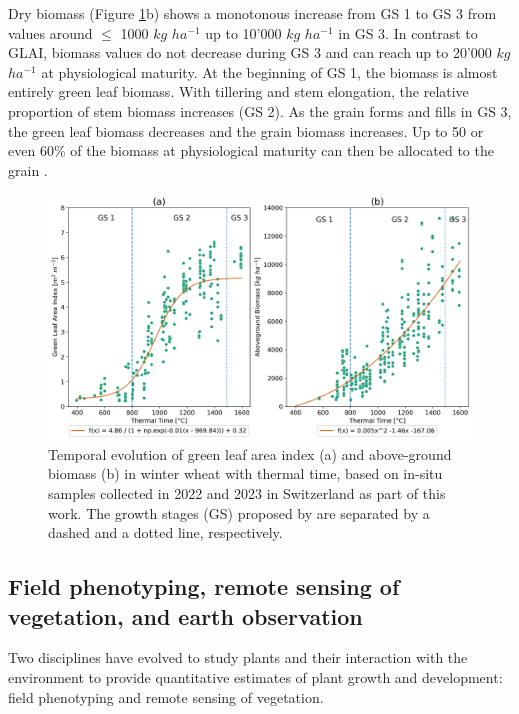 Dry biomass (Figure \ref{fig:ww-growth-development}b) shows a monotonous increase from \gls{GS} 1 to \gls{GS} 3 from values around $\le$ 1000 $kg$ $ha^{-1}$ up to 10'000 $kg$ $ha^{-1}$ in \gls{GS} 3. In contrast to \gls{GLAI}, biomass values do not decrease during \gls{GS} 3 and can reach up to 20'000 $kg$ $ha^{-1}$ at physiological maturity. At the beginning of \gls{GS} 1, the biomass is almost entirely green leaf biomass. With tillering and stem elongation, the relative proportion of stem biomass increases (\gls{GS} 2). As the grain forms and fills in \gls{GS} 3, the green leaf biomass decreases and the grain biomass increases. Up to 50 or even 60\% of the biomass at physiological maturity can then be allocated to the grain \citep{long_meeting_2015}.

\begin{figure}[H]
    \centering
    \includegraphics[width=\textwidth]{01-Introduction/img/glai_and_biomass_growth-stages.png}
    \caption{Temporal evolution of green leaf area index (a) and above-ground biomass (b) in winter wheat with thermal time, based on in-situ samples collected in 2022 and 2023 in Switzerland as part of this work. The growth stages (GS) proposed by \cite{kirby_analysis_1988} are separated by a dashed and a dotted line, respectively.}
    \label{fig:ww-growth-development}
\end{figure}

\subsection{Field phenotyping, remote sensing of vegetation, and earth observation}
\label{subsec:field-phenotyping-rs-eo}

Two disciplines have evolved to study plants and their interaction with the environment to provide quantitative estimates of plant growth and development: field phenotyping and remote sensing of vegetation.


